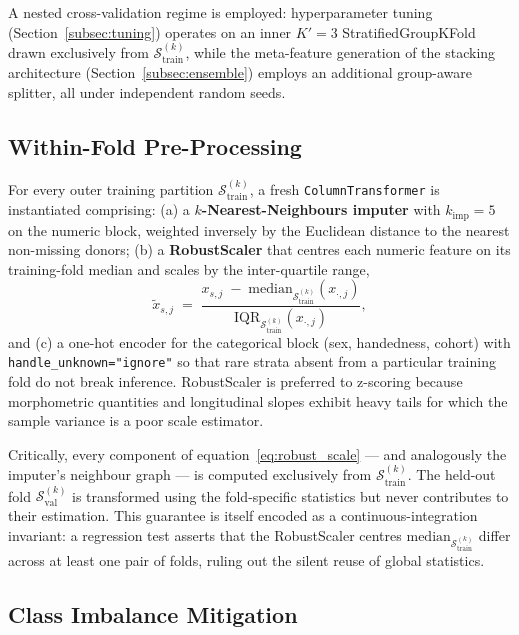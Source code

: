 A nested cross-validation regime is employed: hyperparameter tuning (Section~\ref{subsec:tuning}) operates on an inner $K' = 3$ StratifiedGroupKFold drawn exclusively from $\mathcal{S}_\mathrm{train}^{(k)}$, while the meta-feature generation of the stacking architecture (Section~\ref{subsec:ensemble}) employs an additional group-aware splitter, all under independent random seeds.

\subsection{Within-Fold Pre-Processing}
\label{subsec:preproc}

For every outer training partition $\mathcal{S}_\mathrm{train}^{(k)}$, a fresh \texttt{ColumnTransformer} is instantiated comprising: (a) a \textbf{$k$-Nearest-Neighbours imputer} with $k_{\mathrm{imp}} = 5$ on the numeric block, weighted inversely by the Euclidean distance to the nearest non-missing donors; (b) a \textbf{RobustScaler} that centres each numeric feature on its training-fold median and scales by the inter-quartile range,
\begin{equation}
\tilde{x}_{s,j} \;=\; \frac{x_{s,j} \;-\; \mathrm{median}_{\mathcal{S}_\mathrm{train}^{(k)}}\!\left( x_{\cdot,j} \right)}{\mathrm{IQR}_{\mathcal{S}_\mathrm{train}^{(k)}}\!\left( x_{\cdot,j} \right)},
\label{eq:robust_scale}
\end{equation}
and (c) a one-hot encoder for the categorical block (sex, handedness, cohort) with \texttt{handle\_unknown="ignore"} so that rare strata absent from a particular training fold do not break inference. RobustScaler is preferred to z-scoring because morphometric quantities and longitudinal slopes exhibit heavy tails for which the sample variance is a poor scale estimator.

Critically, every component of equation~\eqref{eq:robust_scale} --- and analogously the imputer's neighbour graph --- is computed exclusively from $\mathcal{S}_\mathrm{train}^{(k)}$. The held-out fold $\mathcal{S}_\mathrm{val}^{(k)}$ is transformed using the fold-specific statistics but never contributes to their estimation. This guarantee is itself encoded as a continuous-integration invariant: a regression test asserts that the RobustScaler centres $\mathrm{median}_{\mathcal{S}_\mathrm{train}^{(k)}}$ differ across at least one pair of folds, ruling out the silent reuse of global statistics.

\subsection{Class Imbalance Mitigation}
\label{subsec:imbalance}

